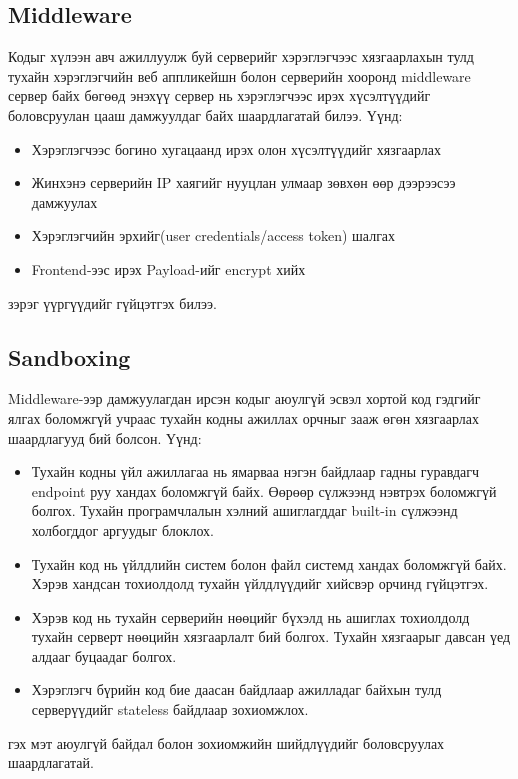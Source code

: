\subsection{Middleware}
Кодыг хүлээн авч ажиллуулж буй серверийг хэрэглэгчээс хязгаарлахын тулд тухайн хэрэглэгчийн веб аппликейшн болон серверийн хооронд middleware сервер байх бөгөөд энэхүү сервер нь хэрэглэгчээс ирэх хүсэлтүүдийг боловсруулан цааш дамжуулдаг байх шаардлагатай билээ. Үүнд:
\begin{itemize}
  \item Хэрэглэгчээс богино хугацаанд ирэх олон хүсэлтүүдийг хязгаарлах
  \item Жинхэнэ серверийн IP хаягийг нууцлан улмаар зөвхөн өөр дээрээсээ дамжуулах
  \item Хэрэглэгчийн эрхийг(user credentials/access token) шалгах
  \item Frontend-ээс ирэх Payload-ийг encrypt хийх
\end{itemize}
зэрэг үүргүүдийг гүйцэтгэх билээ.

\subsection{Sandboxing}
Middleware-ээр дамжуулагдан ирсэн кодыг аюулгүй эсвэл хортой код гэдгийг ялгах боломжгүй учраас тухайн кодны ажиллах орчныг зааж өгөн хязгаарлах шаардлагууд бий болсон. Үүнд:
\begin{itemize}
  \item Тухайн кодны үйл ажиллагаа нь ямарваа нэгэн байдлаар гадны гуравдагч endpoint руу хандах боломжгүй байх. Өөрөөр сүлжээнд нэвтрэх боломжгүй болгох. Тухайн програмчлалын хэлний ашиглагддаг built-in сүлжээнд холбогддог аргуудыг блоклох.
  \item Тухайн код нь үйлдлийн систем болон файл системд хандах боломжгүй байх. Хэрэв хандсан тохиолдолд тухайн үйлдлүүдийг хийсвэр орчинд гүйцэтгэх.
  \item Хэрэв код нь тухайн серверийн нөөцийг бүхэлд нь ашиглах тохиолдолд тухайн серверт нөөцийн хязгаарлалт бий болгох. Тухайн хязгаарыг давсан үед алдааг буцаадаг болгох.
  \item Хэрэглэгч бүрийн код бие даасан байдлаар ажилладаг байхын тулд серверүүдийг stateless\footnotemark{}  байдлаар зохиомжлох.
\end{itemize}
гэх мэт аюулгүй байдал болон зохиомжийн шийдлүүдийг боловсруулах шаардлагатай.

